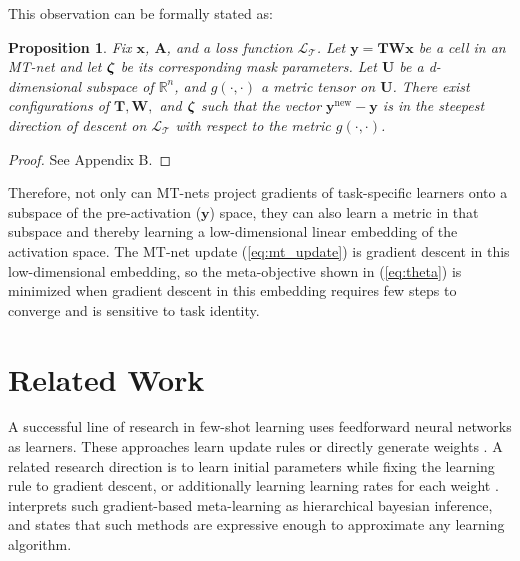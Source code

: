 \documentclass{article}
\newtheorem{prop}{Proposition}
\newcommand{\calT}{{\mathcal{T}}}
\newcommand{\bzeta}{\mbox{\boldmath $\zeta$}}
\newcommand{\0}{{\bf 0}}
\newcommand{\x}{\mathbf{x}}
\newcommand{\y}{\mathbf{y}}
\newcommand{\A}{\mathbf{A}}
\newcommand{\W}{\mathbf{W}}
\newcommand{\T}{\mathbf{T}}
\newcommand{\logit}{\bzeta}
\newcommand{\loss}{\mathcal{L}_{\calT}}
\newcommand{\U}{\mathbf{U}}
\newcommand{\Rn}{\mathbb{R}^n}
\begin{document}
This observation can be formally stated as:
\begin{prop}
\label{prop2}
Fix $\x$, $\A$, and a loss function $\loss$.
Let $\y = \T \W \x$ be a cell in an MT-net and let $\logit$ be its corresponding mask parameters.
Let $\U$ be a d-dimensional subspace of $\Rn$, and $g(\cdot , \cdot)$ a metric tensor on $\U$.
There exist configurations of $\T, \W,$ and $\logit$ such that the vector $\y^\text{new}-\y$ is in 
the steepest direction of descent on $\loss$ with respect to the metric $g(\cdot , \cdot)$.
\end{prop}

\begin{proof}
See Appendix B.
\end{proof}
Therefore, not only can MT-nets project gradients of task-specific learners onto a subspace of the pre-activation ($\y$) space,
they can also learn a metric in that subspace and thereby learning a low-dimensional linear embedding of the activation space.
The MT-net update (\ref{eq:mt_update}) is gradient descent in this low-dimensional embedding,
so the meta-objective shown in (\ref{eq:theta}) is minimized when gradient descent in this embedding requires few steps to converge and is sensitive to task identity.



\section{Related Work}

\iffalse
A straightforward approach for applying meta-learning to deep networks is to meta-learn some pattern of the weights of a neural network or its updates; previous work has learned an update rule \cite{RaviS2017iclr, Li2016nips, Andrychowicz2016nips}, directly generated weights \cite{Ha2017iclr}, or learned good initial weights to fine-tune \cite{FinnC2017arxiv}.
Another line of research uses recurrent neural networks to encode a learning rule and sequentially inputs training data to this neural network \cite{SantoroA2016icml,Mishra2018iclr,MunkhdalaiT2017icml,Duan2016arxiv, Wang2016arxiv}.
An approach that has been successful in the domain of few-shot classification is to learn a distance metric between images and use this metric to find the most similar previously seen image to a new image \cite{KochG2015icml, VinyalsO2016nips, SnellJ2017nips}.
\fi

A successful line of research in few-shot learning uses feedforward neural networks as learners.
These approaches learn update rules \cite{RaviS2017iclr, Li2016nips, Andrychowicz2016nips} or directly generate weights \cite{Ha2017iclr}.
A related research direction is to learn initial parameters \cite{FinnC2017icml} while fixing the learning rule to gradient descent,
 or additionally learning learning rates for each weight \cite{Li2017arxiv}.
\cite{Grant2018iclr} interprets such gradient-based meta-learning as hierarchical bayesian inference, and
\cite{FinnC2017arxiv} states that such methods are expressive enough to approximate any learning algorithm.
\end{document}
